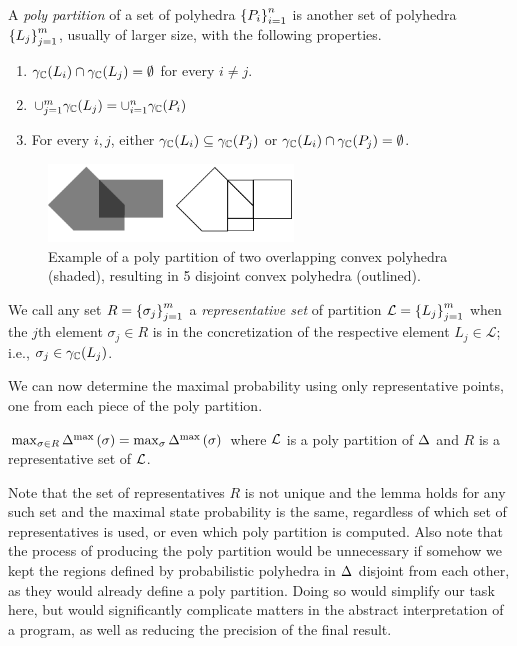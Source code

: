 \begin{definition} \label{def:ppp:pp} A \emph{poly partition} of a set of polyhedra
$ \left\{ P_i \right\}_{i=1}^{n} $ is another set of polyhedra $ \left\{ L_j \right\}_{j=1}^{m} $, usually of
larger size, with the following properties.

\begin{enumerate}
\item{} $ \gamma_{\mathbb{C}}(L_i) \cap \gamma_{\mathbb{C}}(L_j) = \emptyset $
for every $ i \neq j $.
\item{} $ \cup_{j=1}^{m} \gamma_{\mathbb{C}}(L_j) = \cup_{i=1}^{n} \gamma_{\mathbb{C}}(P_i) $
\item{} For every $ i,j $, either $ \gamma_{\mathbb{C}}(L_i) \subseteq \gamma_{\mathbb{C}}(P_j)
$ or $ \gamma_{\mathbb{C}}(L_i) \cap \gamma_{\mathbb{C}}(P_j) = \emptyset $.
\end{enumerate}

\begin{figure}
\begin{center} \includegraphics[width=6.5cm]{figures/poly_partition.pdf} \end{center}
\caption{\label{fig:poly-partition} Example of a poly partition of two
  overlapping convex polyhedra (shaded), resulting in 5 disjoint convex polyhedra
  (outlined).}
\end{figure}

We call any set $R = \left\{ \sigma_j \right\}_{j=1}^{m} $  a \emph{representative set}
of partition $ \mathcal{L} = \left\{ L_j \right\}_{j=1}^{m} $ when the $j$th
element $\sigma_j \in R$ is in the concretization of the respective element $L_j
\in \mathcal{L}$; i.e., $ \sigma_j \in \gamma_{\mathbb{C}}(L_j)$. 

\end{definition}

We can now determine the maximal probability using only representative
points, one from each piece of the poly partition.

\begin{lemma} \label{lem:ppp:pp} $ \max_{\sigma \in R}\Delta_{}^{\text{max}}\left( \sigma \right)
= \max_{\sigma}\Delta_{}^{\text{max}}\left( \sigma \right) $ where $ \mathcal{L} $ is a poly
partition of $ \Delta_{} $ and $ R $ is a representative set
of $ \mathcal{L} $. 
\end{lemma}

Note that the set of representatives $ R $ is not unique and the lemma
holds for any such set and the maximal state probability is the same,
regardless of which set of representatives is used, or even which poly
partition is computed. Also note that the process of producing the
poly partition would be unnecessary if somehow we kept the regions
defined by probabilistic polyhedra in $ \Delta_{} $ disjoint from each
other, as they would already define a poly partition. Doing so would
simplify our task here, but would significantly complicate matters in
the abstract interpretation of a program, as well as reducing the
precision of the final result.

